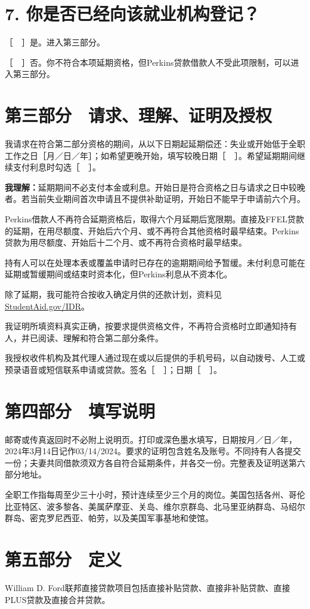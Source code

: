 \documentclass[UTF8,fontset=none,11pt,a4paper]{ctexart}
\begin{document}
\section*{7. 你是否已经向该就业机构登记？}
［　］是。进入第三部分。


［　］否。你不符合本项延期资格，但Perkins贷款借款人不受此项限制，可以进入第三部分。


\section*{第三部分　请求、理解、证明及授权}
我请求在符合第二部分资格的期间，从以下日期起延期偿还：失业或开始低于全职工作之日［月／日／年］；如希望更晚开始，填写较晚日期［　］。希望延期期间继续支付利息时勾选［　］。


\textbf{我理解：}延期期间不必支付本金或利息。开始日是符合资格之日与请求之日中较晚者。若当前失业期间首次申请且不提供补助证明，开始日不能早于申请前六个月。


Perkins借款人不再符合延期资格后，取得六个月延期后宽限期。直接及FFEL贷款的延期，在用尽额度、开始后六个月、或不再符合其他资格时最早结束。Perkins贷款为用尽额度、开始后十二个月、或不再符合资格时最早结束。


持有人可以在处理本表或覆盖申请时已存在的逾期期间给予暂缓。未付利息可能在延期或暂缓期间或结束时资本化，但Perkins利息从不资本化。


除了延期，我可能符合按收入确定月供的还款计划，资料见\url{StudentAid.gov/IDR}。


我证明所填资料真实正确，按要求提供资格文件，不再符合资格时立即通知持有人，并已阅读、理解和符合第二部分条件。


我授权收件机构及其代理人通过现在或以后提供的手机号码，以自动拨号、人工或预录语音或短信联系申请或贷款。签名［　］；日期［　］。


\section*{第四部分　填写说明}
邮寄或传真返回时不必附上说明页。打印或深色墨水填写，日期按月／日／年，2024年3月14日记作03/14/2024。要求的证明包含姓名及账号。不同持有人各提交一份；夫妻共同借款须双方各自符合延期条件，并各交一份。完整表及证明送第六部分地址。


全职工作指每周至少三十小时，预计连续至少三个月的岗位。美国包括各州、哥伦比亚特区、波多黎各、美属萨摩亚、关岛、维尔京群岛、北马里亚纳群岛、马绍尔群岛、密克罗尼西亚、帕劳，以及美国军事基地和使馆。


\section*{第五部分　定义}
William D. Ford联邦直接贷款项目包括直接补贴贷款、直接非补贴贷款、直接PLUS贷款及直接合并贷款。
\end{document}
